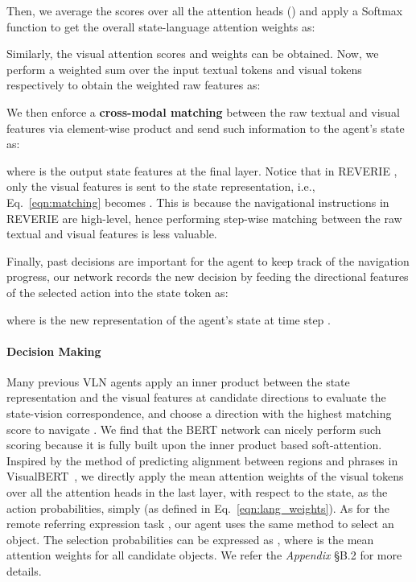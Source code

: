\documentclass[final]{cvpr}
\begin{document}
Then, we average the scores over all the attention heads () and apply a Softmax function to get the overall state-language attention weights as:

Similarly, the visual attention scores  and weights  can be obtained.
Now, we perform a weighted sum over the input textual tokens and visual tokens respectively to obtain the weighted raw features as:

We then enforce a \textbf{cross-modal matching} between the raw textual and visual features via element-wise product and send such information to the agent's state as:

where  is the output state features at the final layer. Notice that in REVERIE \cite{qi2020reverie}, only the visual features is sent to the state representation, i.e., Eq.~\ref{eqn:matching} becomes . This is because the navigational instructions in REVERIE are high-level, hence performing step-wise matching between the raw textual and visual features is less valuable.

Finally, past decisions are important for the agent to keep track of the navigation progress, our network records the new decision by feeding the directional features of the selected action  into the state token as:

where  is the new representation of the agent's state at time step .



\paragraph{Decision Making \label{decision}}
Many previous VLN agents apply an inner product between the state representation and the visual features at candidate directions to evaluate the state-vision correspondence, and choose a direction with the highest matching score to navigate \cite{ma2019self, tan2019learning}. We find that the BERT network can nicely perform such scoring because it is fully built upon the inner product based soft-attention. Inspired by the method of predicting alignment between regions and phrases in VisualBERT~\cite{li2019visualbert}, we directly apply the mean attention weights of the visual tokens over all the attention heads in the last layer, with respect to the state, as the action probabilities, simply  (as defined in Eq.~\ref{eqn:lang_weights}).
As for the remote referring expression task \cite{qi2020reverie}, our agent uses the same method to select an object. The selection probabilities can be expressed as , where  is the mean attention weights for all candidate objects. We refer the \textit{Appendix} \S B.2 for more details.
\end{document}
